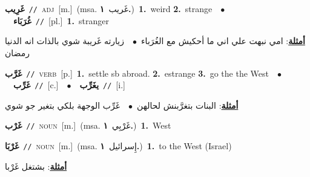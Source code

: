 \documentclass[10pt,a4paper,twoside]{article} %
\begin{document}
\begin{multicols}{2}
{\setlength\topsep{0pt}\textbf{\foreignlanguage{arabic}{غَرِيب}}\ {\color{gray}\texttt{//}\color{black}}\ \textsc{adj}\ [m.]\ \color{gray}(msa. \foreignlanguage{arabic}{غَريب}~\foreignlanguage{arabic}{\textbf{١.}})\color{black}\ \textbf{1.}~weird  \textbf{2.}~strange\ \ $\bullet$\ \ \setlength\topsep{0pt}\textbf{\foreignlanguage{arabic}{غُرَبَاء}}\ {\color{gray}\texttt{//}\color{black}}\ [pl.]\ \textbf{1.}~stranger\  \begin{flushright}\color{gray}\foreignlanguage{arabic}{\textbf{\underline{\foreignlanguage{arabic}{أمثلة}}}: امي نبهت علي اني ما أحكيش مع الغُرَباء\ $\bullet$\ \  زيارته غَريبة شوي بالذات انه الدنيا رمضان}\end{flushright}\color{black}} \vspace{2mm}

{\setlength\topsep{0pt}\textbf{\foreignlanguage{arabic}{غَرَّب}}\ {\color{gray}\texttt{//}\color{black}}\ \textsc{verb}\ [p.]\ \textbf{1.}~settle sb abroad.  \textbf{2.}~estrange  \textbf{3.}~go the the West\ \ $\bullet$\ \ \setlength\topsep{0pt}\textbf{\foreignlanguage{arabic}{غَرِّب}}\ {\color{gray}\texttt{//}\color{black}}\ [c.]\ \ $\bullet$\ \ \setlength\topsep{0pt}\textbf{\foreignlanguage{arabic}{يغَرِّب}}\ {\color{gray}\texttt{//}\color{black}}\ [i.]\  \begin{flushright}\color{gray}\foreignlanguage{arabic}{\textbf{\underline{\foreignlanguage{arabic}{أمثلة}}}: البنات بتغرَّبنش لحالهن\ $\bullet$\ \  غَرِّب الوجهة بلكي بتغير جو شوي}\end{flushright}\color{black}} \vspace{2mm}

{\setlength\topsep{0pt}\textbf{\foreignlanguage{arabic}{غَرْب}}\ {\color{gray}\texttt{//}\color{black}}\ \textsc{noun}\ [m.]\ \color{gray}(msa. \foreignlanguage{arabic}{غَرْبِي}~\foreignlanguage{arabic}{\textbf{١.}})\color{black}\ \textbf{1.}~West\ } \vspace{2mm}

{\setlength\topsep{0pt}\textbf{\foreignlanguage{arabic}{غَرْبَا}}\ {\color{gray}\texttt{//}\color{black}}\ \textsc{noun}\ [m.]\ \color{gray}(msa. \foreignlanguage{arabic}{إِسرائيل}~\foreignlanguage{arabic}{\textbf{١.}})\color{black}\ \textbf{1.}~to the West (Israel)\  \begin{flushright}\color{gray}\foreignlanguage{arabic}{\textbf{\underline{\foreignlanguage{arabic}{أمثلة}}}: بشتغل غَرْبا}\end{flushright}\color{black}} \vspace{2mm}


\end{multicols}
\end{document}
